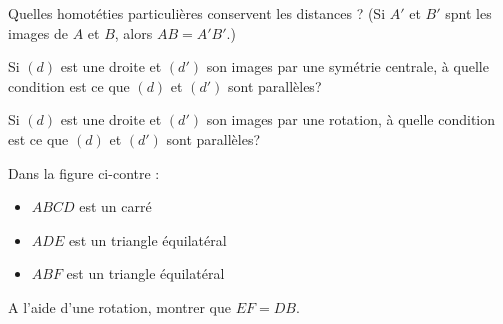 \begin{multicols}{3}
    
    Quelles homotéties particulières conservent les distances ? (Si $A'$ et $B'$ spnt les images de $A$ et $B$, alors $AB=A'B'$.)
    
    
    Si $(d)$ est une droite et $(d')$ son images par une symétrie centrale, à quelle condition est ce que $(d)$ et $(d')$ sont parallèles?
    
    
    Si $(d)$ est une droite et $(d')$ son images par une rotation, à quelle condition est ce que $(d)$ et $(d')$ sont parallèles?
\end{multicols}

\begin{minipage}[t]{0.55\textwidth}

    Dans la figure ci-contre : 
    \begin{itemize}
        \item $ABCD$ est un carré
        \item $ADE$ est un triangle équilatéral
        \item $ABF$ est un triangle équilatéral
    \end{itemize}
    A l'aide d'une rotation, montrer que $EF=DB$.
\end{minipage}
\hfill
\begin{minipage}[t]{0.45\textwidth}
    \begin{figure}[H]
        \centering
    \end{figure}
\end{minipage}